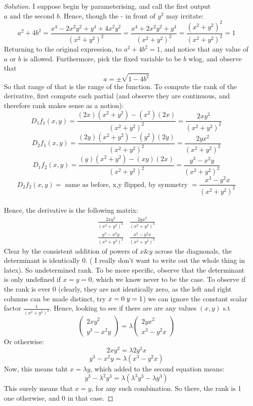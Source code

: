 \documentclass{article}
\newenvironment{problem}[2][Problem]{\begin{trivlist}
\item[\hskip \labelsep {\bfseries #1}\hskip \labelsep {\bfseries #2.}]}{\end{trivlist}}
\newenvironment{solution}{\begin{proof}[Solution]}{\end{proof}}
\begin{document}
\begin{problem}{9.24}
\end{problem}
\begin{solution}
	I suppose begin by parameterising, and call the first output $a \text{ and the second }b$. Hence, though the - in front of $y^{2}$ may irritate: \[
		a^{2}+4b^{2} = \frac{x^{4}-2x^{2}y^{2}+y^{4} + 4x^{2}y^{2}}{(x^{2}+y^{2})^{2}} = \frac{x^{4}+2x^{2}y^{2}+y^{4}}{(x^{2}+y^{2})^{2}} = \frac{(x^{2}+y^{2})^{2}}{(x^{2}+y^{2})^{2}} = 1
	\]
	Returning to the original expression, to $a^{2}+4b^{2}=1$, and notice that any value of $a \text{ or } b$ is allowed. Furthermore, pick the fixed variable to be $b$ wlog, and observe that \[
		a = \pm \sqrt{1-4b^{2}} 
	\]
So that range of that is the range of the function.
To compute the rank of the derivative, first compute each partial (and observe they are continuous, and therefore rank makes sense as a notion):
\[
	D_{1}f_{1}(x,y) = \frac{(2x)(x^{2}+y^{2}) - (x^{2})(2x)}{(x^{2}+y^{2})^{2}} = \frac{2xy^{2}}{(x^{2}+y^{2})^{2}}
\]
\[
	D_{2}f_{1}(x,y) = \frac{(2y)(x^{2}+y^{2}) - (y^{2})(2y)}{(x^{2}+y^{2})^{2}} = \frac{2yx^{2}}{(x^{2}+y^{2})^{2}}
\]
\[
	D_{1}f_{2}(x,y) = \frac{(y)(x^{2}+y^{2}) - (xy)(2x)}{(x^{2}+y^{2})^{2}} = \frac{y^{3}-x^{2}y}{(x^{2}+y^{2})^{2}}
\]
\[
		D_{2}f_{2}(x,y) = \text{ same as before, x,y flipped, by symmetry } = \frac{x^{3}-y^{2}x}{(x^{2}+y^{2})^{2}}
\]
\\
Hence, the derivative is the following matrix:
\[
	\begin{matrix}
		\frac{2xy^{2}}{(x^{2}+y^{2})^{2}} &  \frac{2yx^{2}}{(x^{2}+y^{2})^{2}} \\
		\frac{y^{3}-x^{2}y}{(x^{2}+y^{2})^{2}} & \frac{x^{3} - y^{2}x}{(x^{2}+y^{2})^{2}}
	\end{matrix}
\]
Clear by the consistent addition of powers of $x \text{\&} y$ across the diagnonals, the determinant is identically 0. ( I really don't want to write out the whole thing in latex).
So undetermined rank. To be more specific, observe that the determinant is only undefined if $x=y=0$, which we know never to be the case. To observe if the rank is ever 0 (clearly, they are not identically zero, as the left and right columns can be made distinct, try $x=0 \hspace{1mm} y =1$) we can ignore the constant scalar factor $\frac{1}{(x^{2}+y^{2})^2}$. Hence, looking to see if there are are any values $(x,y)$ s.t \[
	\begin{pmatrix}
		2xy^2 \\
		y^{3}-x^{2}y
	\end{pmatrix} = 
	\lambda \begin{pmatrix}
		2yx^2 \\
		x^{3}-y^{2}x
	\end{pmatrix}
\]
Or otherwise:
\[
2xy^{2} = \lambda 2y^{2}x
\]
\[
y^{3}-x^{2}y= \lambda (x^{3}-y^{2}x)\]
Now, this means taht $x = \lambda y $, which added to the second equation means:
\[
	y^{3} - \lambda^{2}y^{3} = \lambda(\lambda^{3}y^{3}- \lambda y^{3})
\]
This surely means that $x=y$, for any such combination. So there, the rank is 1 one otherwise, and 0 in that case. 
\newpage
\end{solution}
\begin{problem}{9.27}
\end{problem}
\end{document}
